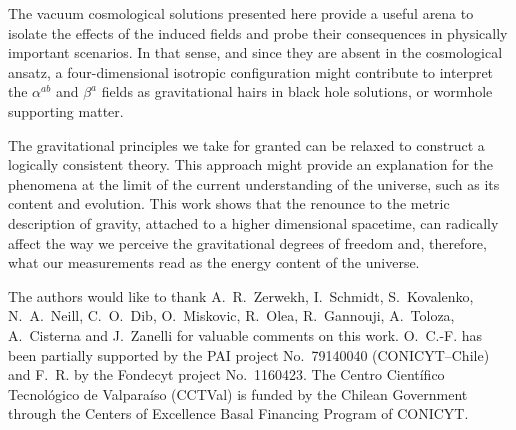 \documentclass[aps,prd,12pt,superscriptaddress,showpacs,showkeys,longbibliography,reprint,nofootinbib]{revtex4-1}
\begin{document}
The vacuum cosmological solutions presented here provide a useful arena to isolate the effects of the induced fields and probe their consequences in physically important scenarios. In that sense, and since they are absent in the cosmological ansatz, a four-dimensional isotropic configuration might contribute to interpret the $\alpha^{ab}$ and $\beta^a$ fields as gravitational hairs in black hole solutions, or wormhole supporting matter. 

The gravitational principles we take for granted can be relaxed to construct a logically consistent theory. This approach might provide an explanation for the phenomena at the limit of the current understanding of the universe, such as its content and evolution. This work shows that the renounce to the metric description of gravity, attached to a higher dimensional spacetime, can radically affect the way we perceive the gravitational degrees of freedom and, therefore, what our measurements read as the energy content of the universe. 





\begin{acknowledgments}
  The authors would like to thank A.~R.~Zerwekh, I.~Schmidt, S.~Kovalenko, N.~A.~Neill, C.~O.~Dib, O.~Miskovic, R.~Olea, R.~Gannouji, A.~Toloza, A.~Cisterna and J.~Zanelli for valuable comments on this work. \mbox{O.~C.-F.} has been partially supported by the PAI project No.~79140040 (CONICYT--Chile) and F.~R. by the Fondecyt project No.~1160423. The Centro Cient\'ifico Tecnol\'ogico de Valpara\'iso (CCTVal) is funded by the Chilean Government through the Centers of Excellence Basal Financing Program of CONICYT.
\end{acknowledgments}
\end{document}
